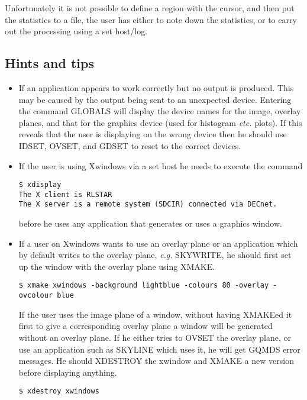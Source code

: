 Unfortunately it is not possible to define a region with the cursor, and then
put the statistics to a file, the user has either to note down the statistics,
or to carry out the processing using a set host/log.
\subsection{Hints and tips}
\begin{itemize}
\item If an application appears to work correctly but no output is produced.
This may be caused by the output being sent to an unexpected device. Entering
the command GLOBALS will display the device names for the image, overlay planes,
and that for the graphics device (used for histogram {\em etc.} plots). If this
reveals that the user is displaying on the wrong device then he should use
IDSET, OVSET, and GDSET  to reset to the correct devices.
\item If the user is using Xwindows via a set host he needs to execute the
command 
\begin{small}
\begin{verbatim}
$ xdisplay
The X client is RLSTAR
The X server is a remote system (SDCIR) connected via DECnet.
\end{verbatim}
\end{small}
before he uses any application that generates or uses a graphics window.
\item If a user on Xwindows wants to use an overlay plane or an application
which by default writes to the overlay plane, {\em e.g.} SKYWRITE, he should
first
set up the window with the overlay plane using XMAKE.
\begin{small}
\begin{verbatim}
$ xmake xwindows -background lightblue -colours 80 -overlay -ovcolour blue
\end{verbatim}
\end{small}
If the user uses the image plane of a window, without having XMAKEed it first
to give a corresponding overlay plane a window will be generated without an
overlay plane. If he either tries to OVSET the overlay plane, or use an
application such as SKYLINE which uses it, he will get GQMDS error messages.
He should XDESTROY the xwindow and XMAKE a new version before displaying
anything.
\begin{small}
\begin{verbatim}
$ xdestroy xwindows
\end{verbatim}
\end{small}

\end{itemize}
